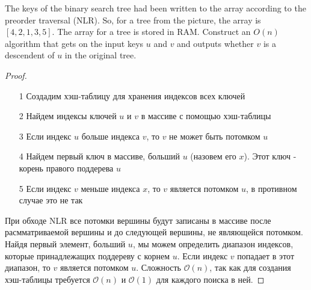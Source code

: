 \begin{prob}
The keys of the binary search tree had been written to the array according to the preorder traversal (NLR). So, for a tree from the picture, the array is $[4,2,1,3,5]$. The array for a tree is stored in RAM. Construct an $O(n)$ algorithm that gets on the input keys $u$ and $v$ and outputs whether $v$ is a descendent of $u$ in the original tree.
\end{prob}
\vskip 0.2in
\begin{proof}
\begin{itemize}
\item[]
\item[1] Создадим хэш-таблицу для хранения индексов всех ключей
\item[2] Найдем индексы ключей $u$ и $v$ в массиве с помощью хэш-таблицы
\item[3] Если индекс $u$ больше индекса $v$, то $v$ не может быть потомком $u$
\item[4] Найдем первый ключ в массиве, больший $u$ (назовем его $x$). Этот ключ - корень правого поддерева $u$
\item[5] Если индекс $v$ меньше индекса $x$, то $v$ является потомком $u$, в противном случае это не так
\end{itemize}

При обходе NLR все потомки вершины будут записаны в массиве после расмматриваемой вершины и до следующей вершины, не являющейся потомком. Найдя первый элемент, больший $u$, мы можем определить диапазон индексов, которые принадлежащих поддереву с корнем $u$. Если индекс $v$ попадает в этот диапазон, то $v$ является потомком $u$.
\vskip 0.1in
Сложность $\mathcal{O}(n)$, так как для создания хэш-таблицы требуется $\mathcal{O}(n)$ и $\mathcal{O}(1)$ для каждого поиска в ней.
\end{proof}
\vskip 0.6in



